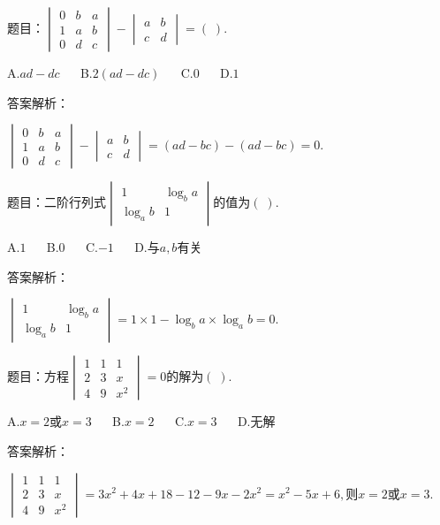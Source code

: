 题目：$\begin{vmatrix}0&b&a\\1&a&b\\0&d&c\end{vmatrix}-\begin{vmatrix}a&b\\c&d\end{vmatrix}=(\;).$

A.$ad-dc$ $\quad$ B.$2(ad-dc)$ $\quad$ C.$0$ $\quad$ D.$1$

答案解析：

$\begin{vmatrix}0&b&a\\1&a&b\\0&d&c\end{vmatrix}-\begin{vmatrix}a&b\\c&d\end{vmatrix}=(ad-bc)-(ad-bc)=0.$



题目：$\mathrm{二阶行列式}\begin{vmatrix}1&\log_ba\\\log_ab&1\end{vmatrix}\mathrm{的值为}(\;).$

A.$1$ $\quad$ B.$0$ $\quad$ C.$-1$ $\quad$ D.$与a,b\mathrm{有关}$

答案解析：

$\begin{vmatrix}1&\log_ba\\\log_ab&1\end{vmatrix}=1\times1-\log_ba\times\log_ab=0.$



题目：$\mathrm{方程}\begin{vmatrix}1&1&1\\2&3&x\\4&9&x^2\end{vmatrix}=0\mathrm{的解为}(\;).$

A.$x=2或x=3$ $\quad$ B.$x=2$ $\quad$ C.$x=3$ $\quad$ D.$\mathrm{无解}$

答案解析：

$\begin{vmatrix}1&1&1\\2&3&x\\4&9&x^2\end{vmatrix}=3x^2+4x+18-12-9x-2x^2=x^2-5x+6,则x=2或x=3.$



